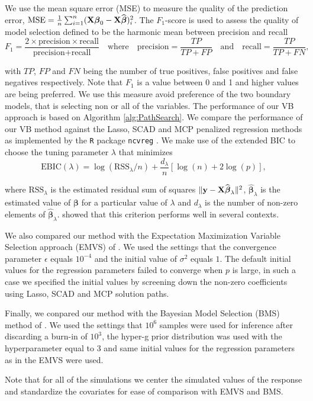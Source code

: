 \documentclass[11pt]{article}
\newtheorem{Main Result}{Main Result}
\def\vectorfontone{\bf}
\def\vectorfonttwo{\boldsymbol}
\def\vy{{\vectorfontone y}}                      %
\def\vbeta{{\vectorfonttwo \beta}}               %
\def\matrixfontone{\bf}
\def\mX{{\matrixfontone X}}                      %
\newcommand{\joc}[1]{{\color{black}#1}}
\begin{document}
We use the
mean square error (MSE) to measure the quality of the prediction error,
$\mbox{MSE} = \frac{1}{n}\sum_{i=1}^n (\mX\vbeta_0 - \mX\widehat{\vbeta})_i^2$.
The $F_1$-score \joc{\citep[see][]{Van_Rijsbergen1979}}
is used to assess the quality of model selection
defined to be the harmonic mean between precision and recall
$$
F_1 = \frac{2 \times \mbox{precision} \times \mbox{recall}}{\mbox{precision} + \mbox{recall}}
\quad \mbox{where} \quad
\mbox{precision} = \frac{TP}{TP + FP} \quad \mbox{and} \quad
\mbox{recall} = \frac{TP}{TP + FN},
$$

\noindent
with $TP$, $FP$ and $FN$ being the number of true positives, false
positives and false negatives respectively. Note that $F_1$ is a value between
0 and 1 and higher values are being preferred. We use this measure 
avoid preference of the two boundary models, that is selecting non or all
of the variables. 
\joc{The performance of our VB approach is based on Algorithm \ref{alg:PathSearch}.}
We compare the
performance of our VB method against the Lasso, SCAD
and MCP penalized regression methods as implemented by the {\tt R} package
{\tt ncvreg} \citep{Breheny2011}. We make use of the extended
BIC \citep{ChenChen2008} to choose the tuning parameter $\lambda$ that 
minimizes
$$
\mbox{EBIC}(\lambda) = \log(\mbox{RSS}_\lambda/n) + \frac{d_\lambda}{n}
\left[ \log(n) + 2\log(p) \right],
$$

\noindent where $\mbox{RSS}_\lambda$ is the estimated residual sum of squares
$\|\vy - \mX\widehat{\vbeta}_\lambda\|^2$, $\widehat{\vbeta}_\lambda$ is the
estimated value of $\vbeta$ for a particular value of $\lambda$ and 
$d_\lambda$ is the number of non-zero elements of $\widehat{\vbeta}_\lambda$.
\cite{Wang2009} showed that this criterion performs well in several contexts.

 
\joc{
We also compared our method with the Expectation Maximization Variable Selection approach
(EMVS) of \cite{Rockova2014}. We used the settings that the convergence parameter $\epsilon$ equals $10^{-4}$ and the initial value of $\sigma^2$ equals $1$. The default initial values for the regression parameters failed to converge when $p$ is large, in such a case we specified the initial values by screening down the non-zero coefficients using Lasso, SCAD and MCP solution paths.	
	
Finally, we conpared our method with the Bayesian Model Selection (BMS) method of \cite{FeldkircherZeugner2009,BMS}. We used the settings that $10^6$ samples were used for inference after discarding a burn-in of $10^3$, the hyper-g prior distribution was used with the hyperparameter equal to 3 and same initial values for the regression parameters as in the EMVS were used.

 
 
Note that for all of the simulations we center the simulated values of the response
and standardize the covariates for ease of comparison with EMVS and BMS.

}
\end{document}
